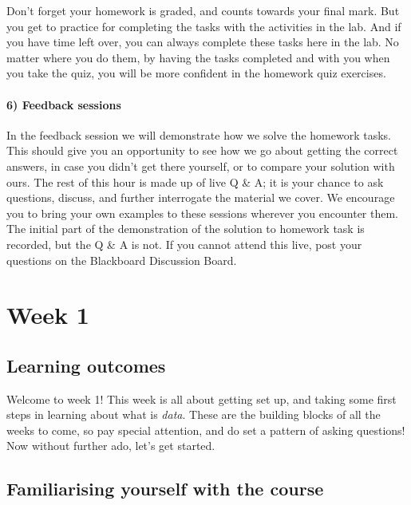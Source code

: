 \documentclass[
]{book}
\begin{document}
Don't forget your homework is graded, and counts towards your final mark. But you get to practice for completing the tasks with the activities in the lab. And if you have time left over, you can always complete these tasks here in the lab. No matter where you do them, by having the tasks completed and with you when you take the quiz, you will be more confident in the homework quiz exercises.

\hypertarget{feedback-sessions}{%
\subsubsection*{6) Feedback sessions}\label{feedback-sessions}}

In the feedback session we will demonstrate how we solve the homework tasks. This should give you an opportunity to see how we go about getting the correct answers, in case you didn't get there yourself, or to compare your solution with ours. The rest of this hour is made up of live Q \& A; it is your chance to ask questions, discuss, and further interrogate the material we cover. We encourage you to bring your own examples to these sessions wherever you encounter them. The initial part of the demonstration of the solution to homework task is recorded, but the Q \& A is not. If you cannot attend this live, post your questions on the Blackboard Discussion Board.

\hypertarget{week1}{%
\chapter{Week 1}\label{week1}}

\hypertarget{learning-outcomes}{%
\section{Learning outcomes}\label{learning-outcomes}}

Welcome to week 1! This week is all about getting set up, and taking some first steps in learning about what is \emph{data}. These are the building blocks of all the weeks to come, so pay special attention, and do set a pattern of asking questions! Now without further ado, let's get started.

\hypertarget{familiarising-yourself-with-the-course}{%
\section{Familiarising yourself with the course}\label{familiarising-yourself-with-the-course}}
\end{document}
